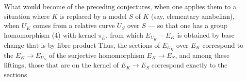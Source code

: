 What would become of the preceding conjectures, when one applies them to a situation where $K$ is replaced by a model $S$ of $K$ (say, elementary anabelian), when $U_K$ comes from a relative curve $U_S$ over $S$ — so that one has a group homomorphism
(4)\quad{}
with kernel $\pi_{\bar U}$, from which $E_{U_K}-E_K$ is obtained by base change that is by fibre product
\quad{}
Thus, the sections of $E_{U_K}$ over $E_K$ correspond to the   $E_K\longrightarrow E_{U_S}$ of the surjective homomorphism $E_K\longrightarrow E_S$, and among these liftings, those that are  on the kernel of $E_K\longrightarrow E_S$ correspond exactly to the sections
